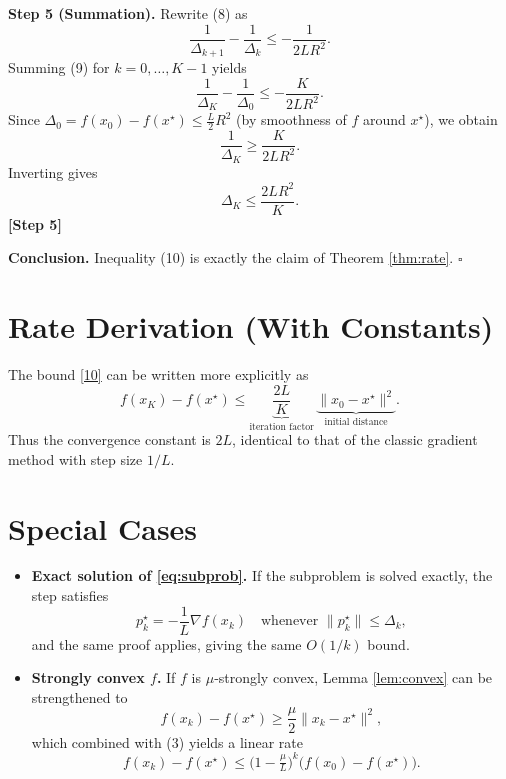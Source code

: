 \documentclass{article}
\begin{document}
\noindent\textbf{Step 5 (Summation).}  
Rewrite (8) as
\[
\frac{1}{\Delta_{k+1}}-\frac{1}{\Delta_{k}}
\le -\frac{1}{2LR^{2}}. \tag{9}
\]
Summing (9) for $k=0,\dots,K-1$ yields
\[
\frac{1}{\Delta_{K}}-\frac{1}{\Delta_{0}}
\le -\frac{K}{2LR^{2}}.
\]
Since $\Delta_{0}=f(x_0)-f(x^\star)\le \frac{L}{2}R^{2}$ (by smoothness of $f$ around $x^\star$), we obtain
\[
\frac{1}{\Delta_{K}}\ge \frac{K}{2LR^{2}}.
\]
Inverting gives
\[
\Delta_{K}\le \frac{2LR^{2}}{K}. \tag{10}
\]
\noindent\textbf{[Step 5]}

\noindent\textbf{Conclusion.}  
Inequality (10) is exactly the claim of Theorem \ref{thm:rate}. $\square$

\section*{Rate Derivation (With Constants)}
The bound \eqref{10} can be written more explicitly as
\[
f(x_K)-f(x^\star)\le \underbrace{\frac{2L}{K}}_{\text{iteration factor}}\,
\underbrace{\|x_0-x^\star\|^{2}}_{\text{initial distance}} .
\]
Thus the convergence constant is $2L$, identical to that of the classic gradient method with step size $1/L$.

\section*{Special Cases}
\begin{itemize}
\item \textbf{Exact solution of \eqref{eq:subprob}.}  
If the subproblem is solved exactly, the step satisfies
\[
p_k^{\star}= -\frac{1}{L}\nabla f(x_k)\quad\text{whenever }\|p_k^{\star}\|\le\Delta_k,
\]
and the same proof applies, giving the same $O(1/k)$ bound.
\item \textbf{Strongly convex $f$.}  
If $f$ is $\mu$‑strongly convex, Lemma \ref{lem:convex} can be strengthened to
\[
f(x_k)-f(x^\star)\ge \frac{\mu}{2}\|x_k-x^\star\|^{2},
\]
which combined with (3) yields a linear rate
\[
f(x_k)-f(x^\star)\le \bigl(1-\tfrac{\mu}{L}\bigr)^{k}\bigl(f(x_0)-f(x^\star)\bigr).
\]
\end{itemize}
\end{document}
